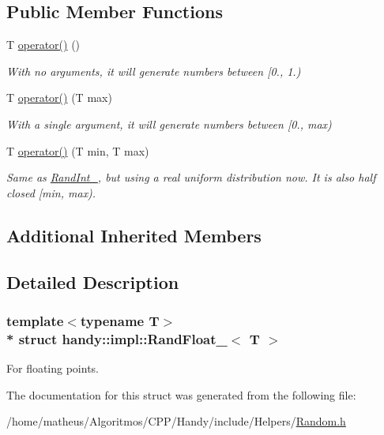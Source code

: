 \subsection*{Public Member Functions}
\begin{DoxyCompactItemize}
\item 
T \hyperlink{group__RandomGroup_ga3448918864fd58b3dcbdad0c548323ce}{operator()} ()
\begin{DoxyCompactList}\small\item\em With no arguments, it will generate numbers between \mbox{[}0., 1.) \end{DoxyCompactList}\item 
T \hyperlink{group__RandomGroup_ga8a3a1dc2369d8758d43250474a1c391d}{operator()} (T max)
\begin{DoxyCompactList}\small\item\em With a single argument, it will generate numbers between \mbox{[}0., max) \end{DoxyCompactList}\item 
T \hyperlink{group__RandomGroup_ga36eca80e7e43044caec35d03f27df419}{operator()} (T min, T max)
\begin{DoxyCompactList}\small\item\em Same as \textquotesingle{}\hyperlink{structhandy_1_1impl_1_1RandInt__}{Rand\+Int\+\_\+}\textquotesingle{}, but using a real uniform distribution now. It is also half closed \mbox{[}min, max). \end{DoxyCompactList}\end{DoxyCompactItemize}
\subsection*{Additional Inherited Members}


\subsection{Detailed Description}
\subsubsection*{template$<$typename T$>$\\*
struct handy\+::impl\+::\+Rand\+Float\+\_\+$<$ T $>$}

For floating points. 

The documentation for this struct was generated from the following file\+:\begin{DoxyCompactItemize}
\item 
/home/matheus/\+Algoritmos/\+C\+P\+P/\+Handy/include/\+Helpers/\hyperlink{Random_8h}{Random.\+h}\end{DoxyCompactItemize}
